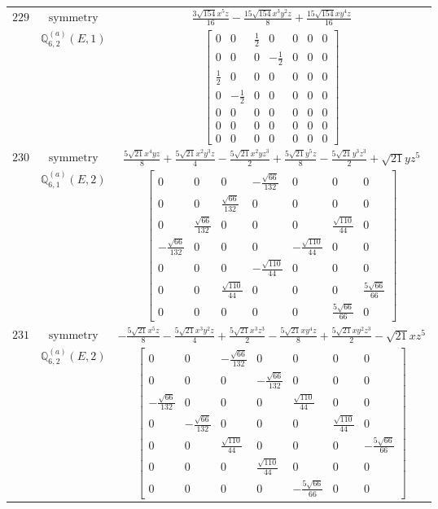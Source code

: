 \documentclass[fleqn,8pt,landscape]{jsarticle}
\begin{document}
\begin{longtable}{ccc}
$ 229 $ & $ \text{symmetry} $ & $ \frac{3 \sqrt{154} x^{5} z}{16} - \frac{15 \sqrt{154} x^{3} y^{2} z}{8} + \frac{15 \sqrt{154} x y^{4} z}{16} $ \\
$  $ & $ \mathbb{Q}_{6,2}^{(a)}(E,1) $ & $ \begin{bmatrix} 0 & 0 & \frac{1}{2} & 0 & 0 & 0 & 0 \\ 0 & 0 & 0 & - \frac{1}{2} & 0 & 0 & 0 \\ \frac{1}{2} & 0 & 0 & 0 & 0 & 0 & 0 \\ 0 & - \frac{1}{2} & 0 & 0 & 0 & 0 & 0 \\ 0 & 0 & 0 & 0 & 0 & 0 & 0 \\ 0 & 0 & 0 & 0 & 0 & 0 & 0 \\ 0 & 0 & 0 & 0 & 0 & 0 & 0 \end{bmatrix} $ \\ \hline
$ 230 $ & $ \text{symmetry} $ & $ \frac{5 \sqrt{21} x^{4} y z}{8} + \frac{5 \sqrt{21} x^{2} y^{3} z}{4} - \frac{5 \sqrt{21} x^{2} y z^{3}}{2} + \frac{5 \sqrt{21} y^{5} z}{8} - \frac{5 \sqrt{21} y^{3} z^{3}}{2} + \sqrt{21} y z^{5} $ \\
$  $ & $ \mathbb{Q}_{6,1}^{(a)}(E,2) $ & $ \begin{bmatrix} 0 & 0 & 0 & - \frac{\sqrt{66}}{132} & 0 & 0 & 0 \\ 0 & 0 & \frac{\sqrt{66}}{132} & 0 & 0 & 0 & 0 \\ 0 & \frac{\sqrt{66}}{132} & 0 & 0 & 0 & \frac{\sqrt{110}}{44} & 0 \\ - \frac{\sqrt{66}}{132} & 0 & 0 & 0 & - \frac{\sqrt{110}}{44} & 0 & 0 \\ 0 & 0 & 0 & - \frac{\sqrt{110}}{44} & 0 & 0 & 0 \\ 0 & 0 & \frac{\sqrt{110}}{44} & 0 & 0 & 0 & \frac{5 \sqrt{66}}{66} \\ 0 & 0 & 0 & 0 & 0 & \frac{5 \sqrt{66}}{66} & 0 \end{bmatrix} $ \\ \hline
$ 231 $ & $ \text{symmetry} $ & $ - \frac{5 \sqrt{21} x^{5} z}{8} - \frac{5 \sqrt{21} x^{3} y^{2} z}{4} + \frac{5 \sqrt{21} x^{3} z^{3}}{2} - \frac{5 \sqrt{21} x y^{4} z}{8} + \frac{5 \sqrt{21} x y^{2} z^{3}}{2} - \sqrt{21} x z^{5} $ \\
$  $ & $ \mathbb{Q}_{6,2}^{(a)}(E,2) $ & $ \begin{bmatrix} 0 & 0 & - \frac{\sqrt{66}}{132} & 0 & 0 & 0 & 0 \\ 0 & 0 & 0 & - \frac{\sqrt{66}}{132} & 0 & 0 & 0 \\ - \frac{\sqrt{66}}{132} & 0 & 0 & 0 & \frac{\sqrt{110}}{44} & 0 & 0 \\ 0 & - \frac{\sqrt{66}}{132} & 0 & 0 & 0 & \frac{\sqrt{110}}{44} & 0 \\ 0 & 0 & \frac{\sqrt{110}}{44} & 0 & 0 & 0 & - \frac{5 \sqrt{66}}{66} \\ 0 & 0 & 0 & \frac{\sqrt{110}}{44} & 0 & 0 & 0 \\ 0 & 0 & 0 & 0 & - \frac{5 \sqrt{66}}{66} & 0 & 0 \end{bmatrix} $ \\ \hline

\end{longtable}
\end{document}
